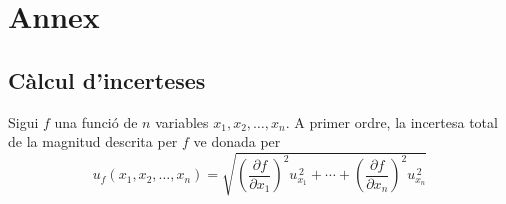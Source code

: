\documentclass[a4paper,twoside,12pt]{article}
\theoremstyle{definition}
\begin{document}
	\section{Annex}
	\subsection{Càlcul d'incerteses}\label{subsec:incerteses}
	
	Sigui $f$ una funció de $n$ variables $x_1,x_2,\ldots,x_n$. A primer ordre, la incertesa total de la magnitud descrita per $f$ ve donada per
	\begin{equation}
			u_f(x_1,x_2,\ldots,x_n)
		= \sqrt{\left(\frac{\partial f}{\partial x_1}\right)^{\!2} u_{x_1}^{\,2}
			+ \cdots +
			\left(\frac{\partial f}{\partial x_n}\right)^{\!2} u_{x_n}^{\,2}}
		\label{eq:propagation}
	\end{equation}
\end{document}
